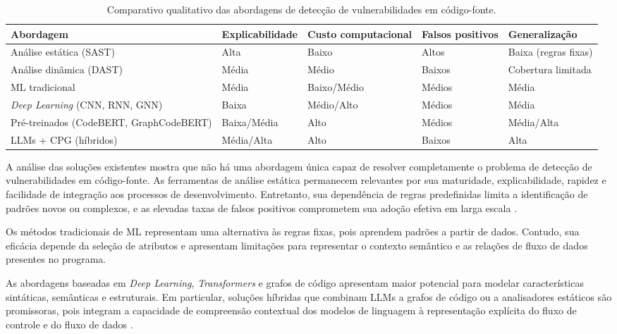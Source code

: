\begin{table}[htbp]
  \centering
  \caption{Comparativo qualitativo das abordagens de detecção de vulnerabilidades em código-fonte.}
  \label{tab:comparativo_abordagens}
  \footnotesize
  \setlength{\tabcolsep}{4pt}
  \renewcommand{\arraystretch}{1.3}
  \begin{tabular}{p{3.6cm}p{1.8cm}p{1.8cm}p{1.6cm}p{2.3cm}}
    \hline
    \textbf{Abordagem} & \textbf{Explica\-bili\-dade} & \textbf{Custo compu\-tacional} & \textbf{Falsos posi\-tivos} & \textbf{Generalização} \\
    \hline
    Análise estática (SAST) & Alta & Baixo & Altos & Baixa (regras fixas) \\
    Análise dinâmica (DAST) & Média & Médio & Baixos & Cobertura limitada \\
    ML tradicional & Média & Baixo/Médio & Médios & Média \\
    \textit{Deep Learning} (CNN, RNN, GNN) & Baixa & Médio/Alto & Médios & Média \\
    Pré-treinados (CodeBERT, GraphCodeBERT) & Baixa/Média & Alto & Médios & Média/Alta \\
    LLMs + CPG (híbridos) & Média/Alta & Alto & Baixos & Alta \\
    \hline
  \end{tabular}
\end{table}


A análise das soluções existentes mostra que não há uma abordagem única
capaz de resolver completamente o problema de detecção de
vulnerabilidades em código-fonte. As ferramentas de análise estática
permanecem relevantes por sua maturidade, explicabilidade, rapidez e
facilidade de integração aos processos de desenvolvimento. Entretanto,
sua dependência de regras predefinidas limita a identificação de
padrões novos ou complexos, e as elevadas taxas de falsos positivos
comprometem sua adoção efetiva em larga escala \cite{techscience2025,yang2025}.

Os métodos tradicionais de ML representam uma alternativa às regras
fixas, pois aprendem padrões a partir de dados. Contudo, sua eficácia
depende da seleção de atributos e apresentam limitações para
representar o contexto semântico e as relações de fluxo de dados
presentes no programa.

As abordagens baseadas em \textit{Deep Learning}, \textit{Transformers} e
grafos de código apresentam maior potencial para modelar características
sintáticas, semânticas e estruturais. Em particular, soluções híbridas
que combinam LLMs a grafos de código ou a analisadores estáticos são
promissoras, pois integram a capacidade de compreensão contextual dos
modelos de linguagem à representação explícita do fluxo de controle e do
fluxo de dados \cite{svgen2026,llmxcpg2025,yang2025}.

